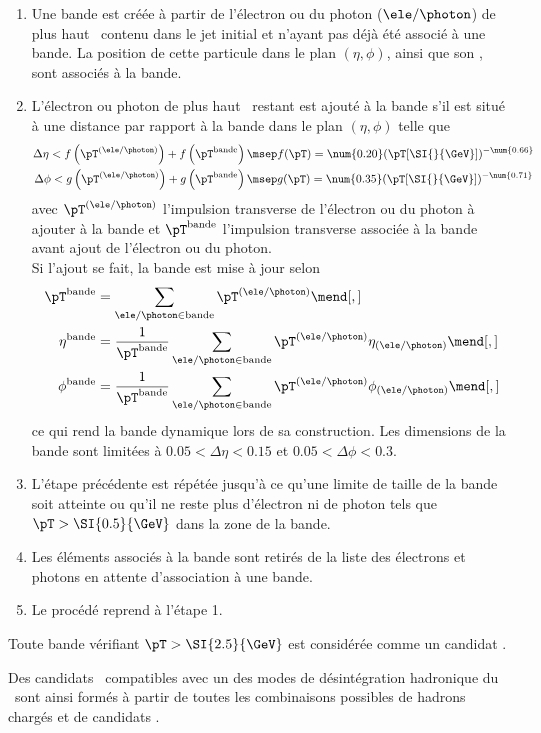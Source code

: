 \begin{enumerate}
\item Une bande est créée à partir de l'électron ou du photon ($\ele/\photon$) de plus haut \pT\ contenu dans le jet initial et n'ayant pas déjà été associé à une bande. La position de cette particule dans le plan $(\eta,\phi)$, ainsi que son \pT, sont associés à la bande.
\item L'électron ou photon de plus haut \pT\ restant est ajouté à la bande s'il est situé à une distance par rapport à la bande dans le plan $(\eta,\phi)$ telle que
\begin{align}
\Delta\eta < f\left(\pT^{(\ele/\photon)}\right) + f\left(\pT^\text{bande}\right) \msep& f(\pT) = \num{0.20} (\pT [\SI{}{\GeV}])^{-\num{0.66}}\\
\Delta\phi < g\left(\pT^{(\ele/\photon)}\right) + g\left(\pT^\text{bande}\right) \msep& g(\pT) = \num{0.35} (\pT [\SI{}{\GeV}])^{-\num{0.71}}
\end{align}
avec $\pT^{(\ele/\photon)}$ l'impulsion transverse de l'électron ou du photon à ajouter à la bande et $\pT^\text{bande}$ l'impulsion transverse associée à la bande avant ajout de l'électron ou du photon.\\
Si l'ajout se fait, la bande est mise à jour selon
\begin{align}
\pT^\text{bande} &= \sum_{\ele/\photon\in\text{bande}}\pT^{(\ele/\photon)}\mend[,]\\
\eta^\text{bande} &= \frac{1}{\pT^\text{bande}} \sum_{\ele/\photon\in\text{bande}}\pT^{(\ele/\photon)} \eta_{(\ele/\photon)}\mend[,]\\
\phi^\text{bande} &= \frac{1}{\pT^\text{bande}} \sum_{\ele/\photon\in\text{bande}}\pT^{(\ele/\photon)} \phi_{(\ele/\photon)}\mend[,]
\end{align}
ce qui rend la bande dynamique lors de sa construction.
Les dimensions de la bande sont limitées à $\num{0.05}<\Delta\eta<\num{0.15}$ et $\num{0.05}<\Delta\phi<\num{0.3}$.
\item L'étape précédente est répétée jusqu'à ce qu'une limite de taille de la bande soit atteinte ou qu'il ne reste plus d'électron ni de photon tels que $\pT>\SI{0.5}{\GeV}$ dans la zone de la bande.
\item Les éléments associés à la bande sont retirés de la liste des électrons et photons en attente d'association à une bande.
\item Le procédé reprend à l'étape 1.
\end{enumerate}
Toute bande vérifiant $\pT>\SI{2.5}{\GeV}$ est considérée comme un candidat \pionnull.
\par
Des candidats \tauh\ compatibles avec un des modes de désintégration hadronique du \tau\ sont ainsi formés à partir de toutes les combinaisons possibles de hadrons chargés et de candidats \pionnull.
